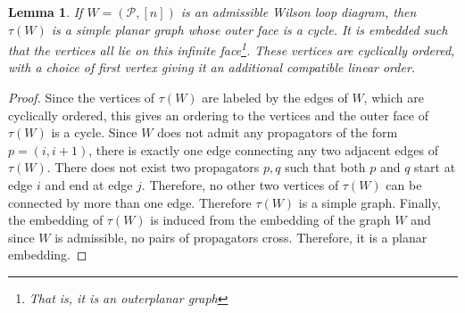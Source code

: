 \documentclass[11pt]{article}
\newcommand{\cP}{\mathcal{P}}
\newtheorem{lem}[thm]{Lemma}
\theoremstyle{remark}
\theoremstyle{definition}
\begin{document}
\begin{lem}\label{tausimpleplanarlem}
If $W = (\cP, [n])$ is an admissible Wilson loop diagram, then $\tau(W)$ is a simple planar graph whose outer face is a cycle. It is embedded such that the vertices all lie on this infinite face\footnote{That is, it is an \emph{outerplanar} graph}. These vertices are cyclically ordered, with a choice of first vertex giving it an additional compatible linear order.
\end{lem}

\begin{proof}
Since the vertices of $\tau(W)$ are labeled by the edges of $W$, which are cyclically ordered, this gives an ordering to the vertices and the outer face of $\tau(W)$ is a cycle.  Since $W$ does not admit any propagators of the form $p = (i, i+1)$, there is exactly one edge connecting any two adjacent edges of $\tau(W)$. There does not exist two propagators $p,q$ such that both $p$ and $q$ start at edge $i$ and end at edge $j$. Therefore, no other two vertices of $\tau(W)$ can be connected by more than one edge.  Therefore $\tau(W)$ is a simple graph. Finally, the embedding of $\tau(W)$ is induced from the embedding of the graph $W$ and since $W$ is admissible, no pairs of propagators cross. Therefore, it is a planar embedding. 
 \end{proof}
\end{document}
